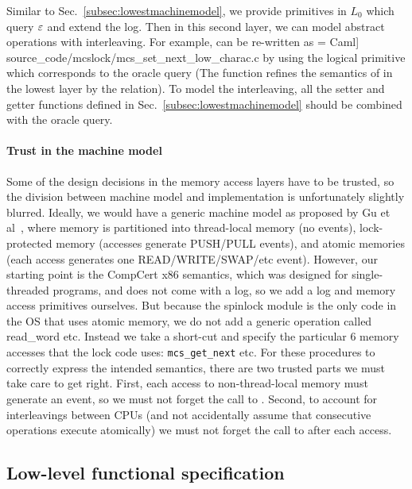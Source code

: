 Similar to Sec.~\ref{subsec:lowestmachinemodel}, we provide primitives in $L_0$ which query ${\varepsilon}$ and extend the log.
Then in this second layer, we can model abstract operations with interleaving.
For example,  can be re-written as
 = Caml] {source_code/mcslock/mcs_set_next_low_charac.c}
by using the logical primitive which corresponds to the oracle query
(The function  refines the semantics of  in the lowest layer by the  relation).
To model the interleaving, all the setter and getter functions defined
in Sec.~\ref{subsec:lowestmachinemodel} should be combined with the
oracle query.

\paragraph{Trust in the machine model}
Some of the design decisions in the memory access
layers have to be trusted, so the division between machine model and
implementation is unfortunately slightly blurred.
Ideally, we would have a generic machine model as proposed by Gu et
al~\cite{certikos16}, where memory is partitioned into thread-local
memory (no events), lock-protected memory (accesses generate PUSH/PULL
events), and atomic memories (each access
generates one READ/WRITE/SWAP/etc event).  However, our starting point
is the CompCert x86 semantics, which was designed for single-threaded
programs, and does not come with a log, so we add a log and memory access
primitives ourselves.
But because the spinlock module is the only code in the OS that uses
atomic memory, we do not add a generic operation called
read\_word etc. Instead we take a short-cut and specify the particular
6 memory accesses that the lock code uses: \lstinline$mcs_get_next$ etc.
For these procedures to correctly express the intended semantics,
there are two trusted parts we must take care to get right. First,
each access to non-thread-local memory must generate an event, so we
must not forget the call to
. 
Second, to account for
interleavings between CPUs (and not accidentally assume that consecutive
operations execute atomically) we must not forget the call to
 after each access.


\subsection{Low-level functional specification}
\label{subsec:atomicoperation}

